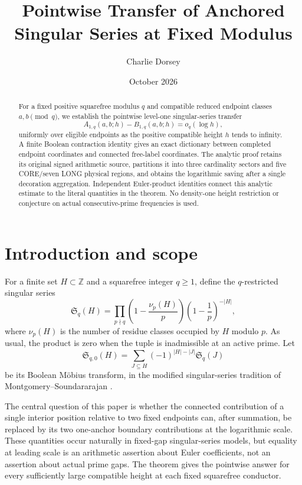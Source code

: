 \documentclass[11pt]{article}
\title{Pointwise Transfer of Anchored Singular Series at Fixed Modulus}
\author{Charlie Dorsey}
\date{October 2026}
\theoremstyle{definition}
\theoremstyle{remark}
\newcommand{\SSer}{\mathfrak S}
\newcommand{\1}{\mathbf 1}
\newcommand{\Zmod}{\mathbb Z}
\begin{document}
\maketitle

\begin{abstract}
For a fixed positive squarefree modulus $q$ and compatible reduced
endpoint classes $a,b\pmod q$, we establish the pointwise level-one
singular-series transfer
\[
 A_{1,q}(a,b;h)-B_{1,q}(a,b;h)=o_q(\log h),
\]
uniformly over eligible endpoints as the positive compatible height
$h$ tends to infinity. A finite Boolean contraction identity gives
an exact dictionary between completed endpoint coordinates and
connected free-label coordinates. The analytic proof retains its
original signed arithmetic source, partitions it into three
cardinality sectors and five CORE/seven LONG physical regions,
and obtains the logarithmic saving after a single decoration
aggregation. Independent Euler-product identities connect this
analytic estimate to the literal quantities in the theorem.
No density-one height restriction or conjecture on actual
consecutive-prime frequencies is used.
\end{abstract}

\section{Introduction and scope}\label{sec:intro}

For a finite set $H\subset\Zmod$ and a squarefree integer $q\ge1$, define the $q$-restricted singular series
\begin{equation}\label{eq:S_q}
\SSer_q(H)
=\prod_{p\nmid q}
\left(1-\frac{\nu_p(H)}p\right)
\left(1-\frac1p\right)^{-|H|},
\end{equation}
where $\nu_p(H)$ is the number of residue classes occupied by $H$ modulo $p$.  As usual, the product is zero when the tuple is inadmissible at an active prime.  Let
\begin{equation}\label{eq:S_q0}
\SSer_{q,0}(H)
=\sum_{J\subseteq H}(-1)^{|H|-|J|}\SSer_q(J)
\end{equation}
be its Boolean M\"obius transform, in the modified singular-series tradition of Montgomery--Soundararajan \cite{MontgomerySoundararajan2004}.

The central question of this paper is whether the connected
contribution of a single interior position relative to two fixed
endpoints can, after summation, be replaced by its two one-anchor
boundary contributions at the logarithmic scale. These
quantities occur naturally in fixed-gap singular-series models,
but equality at leading scale is an arithmetic assertion about
Euler coefficients, not an assertion about actual prime gaps.
The theorem gives the pointwise answer for every sufficiently
large compatible height at each fixed squarefree conductor.
\end{document}
